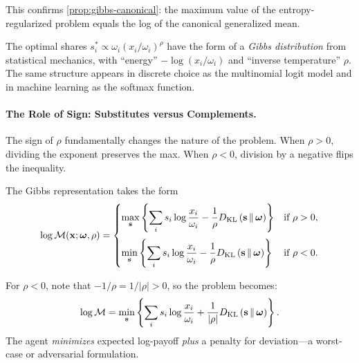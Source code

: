 This confirms \cref{prop:gibbs-canonical}: the maximum value of the entropy-regularized problem equals the log of the canonical generalized mean.

\begin{calloutnote}
The optimal shares $s_i^* \propto \omega_i (x_i/\omega_i)^\rho$ have the form of a \emph{Gibbs distribution} from statistical mechanics, with ``energy'' $-\log(x_i/\omega_i)$ and ``inverse temperature'' $\rho$. The same structure appears in discrete choice as the multinomial logit model and in machine learning as the softmax function.
\end{calloutnote}

\paragraph{The Role of Sign: Substitutes versus Complements.}

The sign of $\rho$ fundamentally changes the nature of the problem. When $\rho > 0$, dividing the exponent preserves the max. When $\rho < 0$, division by a negative flips the inequality.

\begin{proposition}
\label{prop:max-min}
The Gibbs representation takes the form
\begin{equation}
\label{eq:gibbs-max-min}
\log \mathcal{M}(\mathbf{x}; \boldsymbol{\omega}, \rho) = 
\begin{cases}
\displaystyle\max_{\mathbf{s}} \left\{ \sum_i s_i \log \frac{x_i}{\omega_i} - \frac{1}{\rho} D_{\mathrm{KL}}\left(\mathbf{s} \,\|\, \boldsymbol{\omega}\right) \right\} & \text{if } \rho > 0, \\[1.5em]
\displaystyle\min_{\mathbf{s}} \left\{ \sum_i s_i \log \frac{x_i}{\omega_i} - \frac{1}{\rho} D_{\mathrm{KL}}\left(\mathbf{s} \,\|\, \boldsymbol{\omega}\right) \right\} & \text{if } \rho < 0.
\end{cases}
\end{equation}
\end{proposition}

For $\rho < 0$, note that $-1/\rho = 1/|\rho| > 0$, so the problem becomes:
\begin{equation}
\log \mathcal{M} = \min_{\mathbf{s}} \left\{ \sum_i s_i \log \frac{x_i}{\omega_i} + \frac{1}{|\rho|} D_{\mathrm{KL}}\left(\mathbf{s} \,\|\, \boldsymbol{\omega}\right) \right\}.
\end{equation}
The agent \emph{minimizes} expected log-payoff \emph{plus} a penalty for deviation---a worst-case or adversarial formulation.


